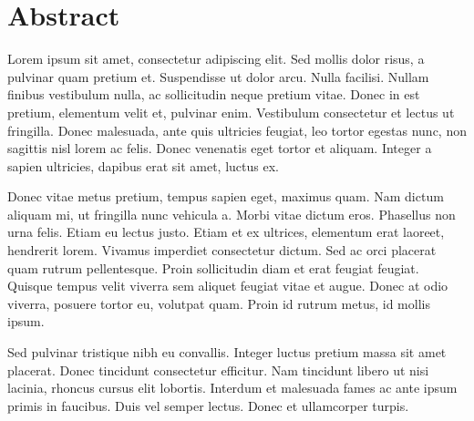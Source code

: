 \chapter*{Abstract}

Lorem ipsum sit amet, consectetur adipiscing elit. Sed mollis dolor risus, a pulvinar quam pretium et. Suspendisse ut dolor arcu. Nulla facilisi. Nullam finibus vestibulum nulla, ac sollicitudin neque pretium vitae. Donec in est pretium, elementum velit et, pulvinar enim. Vestibulum consectetur et lectus ut fringilla. Donec malesuada, ante quis ultricies feugiat, leo tortor egestas nunc, non sagittis nisl lorem ac felis. Donec venenatis eget tortor et aliquam. Integer a sapien ultricies, dapibus erat sit amet, luctus ex.

Donec vitae metus pretium, tempus sapien eget, maximus quam. Nam dictum aliquam mi, ut fringilla nunc vehicula a. Morbi vitae dictum eros. Phasellus non urna felis. Etiam eu lectus justo. Etiam et ex ultrices, elementum erat laoreet, hendrerit lorem. Vivamus imperdiet consectetur dictum. Sed ac orci placerat quam rutrum pellentesque. Proin sollicitudin diam et erat feugiat feugiat. Quisque tempus velit viverra sem aliquet feugiat vitae et augue. Donec at odio viverra, posuere tortor eu, volutpat quam. Proin id rutrum metus, id mollis ipsum.

Sed pulvinar tristique nibh eu convallis. Integer luctus pretium massa sit amet placerat. Donec tincidunt consectetur efficitur. Nam tincidunt libero ut nisi lacinia, rhoncus cursus elit lobortis. Interdum et malesuada fames ac ante ipsum primis in faucibus. Duis vel semper lectus. Donec et ullamcorper turpis.